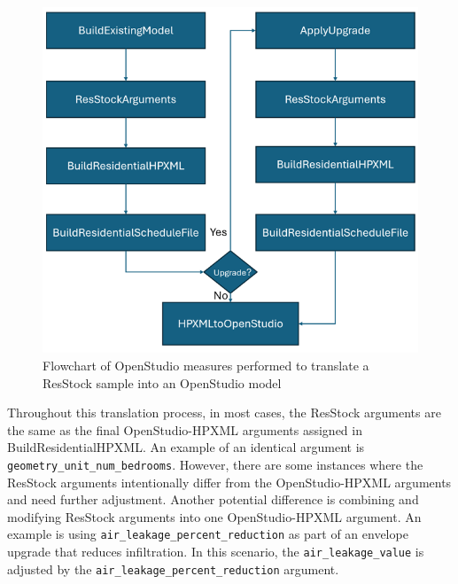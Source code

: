 \begin{figure}
    \centering
    \includegraphics[width=1\linewidth]{images/OSHPXML.png}
    \caption{Flowchart of OpenStudio measures performed to translate a ResStock sample into an OpenStudio model}
    \label{fig:os-hpxml}
\end{figure}

Throughout this translation process, in most cases, the ResStock arguments are the same as the final OpenStudio-HPXML arguments assigned in BuildResidentialHPXML. An example of an identical argument is \texttt{geometry\_unit\_num\_bedrooms}. However, there are some instances where the ResStock arguments intentionally differ from the OpenStudio-HPXML arguments and need further adjustment.  Another potential difference is combining and modifying ResStock arguments into one OpenStudio-HPXML argument. An example is using \texttt{air\_leakage\_percent\_reduction} as part of an envelope upgrade that reduces infiltration. In this scenario, the \texttt{air\_leakage\_value} is adjusted by the \texttt{air\_leakage\_percent\_reduction} argument.

